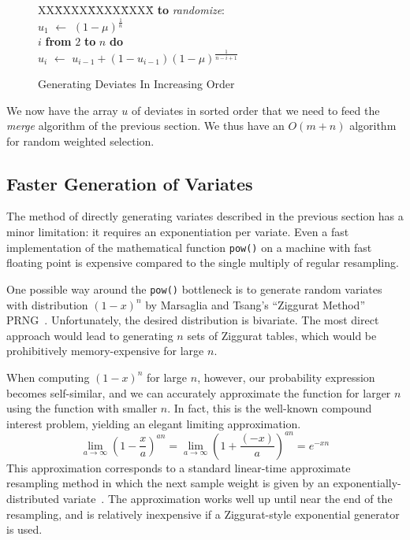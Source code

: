 \documentclass{article}
\newcommand{\asgn}{\,\,\leftarrow\,\,}
\begin{document}
  \begin{figure}
    \centering
    \begin{minipage}[b]{\linewidth}
      \begin{tabbing}
      XX\=XXXX\=XXXX\=XXXX\=\kill
      {\bf to} {\it randomize}: \\
      \>$u_1 \asgn (1-\mu)^{\frac{1}{n}}$ \\
       $i$ {\bf from} $2$ {\bf to} $n$ {\bf do} \\
      \>\>$u_i \asgn u_{i-1} + (1-u_{i-1})(1-\mu)^{\frac{1}{n-i+1}}$
    \end{tabbing}
    \end{minipage}
    \caption{Generating Deviates In Increasing Order}\label{fig:deviate}
  \end{figure}

  We now have the array $u$ of deviates in sorted order that
  we need to feed the {\em merge} algorithm of the previous
  section.  We thus have an $O(m + n)$ algorithm for random
  weighted selection.

\subsection{Faster Generation of Variates}

  The method of directly generating variates described in the
  previous section has a minor limitation: it requires an
  exponentiation per variate.  Even a fast implementation of
  the mathematical function {\tt pow()} on a machine with
  fast floating point is expensive compared to the single
  multiply of regular resampling.

  One possible way around the {\tt pow()} bottleneck is to generate
  random variates with distribution $(1 - x)^n$ by
  Marsaglia and
  Tsang's ``Ziggurat Method'' PRNG~\cite{ziggurat,ziggurat-fixes}.
  Unfortunately, the desired
  distribution is bivariate.  The most direct
  approach would lead to generating $n$ sets of Ziggurat
  tables, which would be prohibitively memory-expensive for
  large $n$.

  When computing $(1 - x)^n$ for large $n$, however, our
  probability expression becomes self-similar, and we can
  accurately approximate the function for larger $n$ using
  the function with smaller $n$.  In fact, this is the
  well-known compound interest problem, yielding an elegant
  limiting approximation.
 $$
\lim_{a \rightarrow \infty}\left(1 - \frac{x}{a}\right)^{an}
  =   \lim_{a \rightarrow \infty}\left(1 + \frac{(-x)}{a}\right)^{an}
  = e^{-xn}$$  This approximation corresponds to a standard 
  linear-time approximate resampling method in which the next sample
  weight is given by an exponentially-distributed
  variate~\cite{carpenter}.  The approximation works well up until near the
  end of the resampling, and is relatively inexpensive if a
  Ziggurat-style exponential generator is used.
\end{document}
